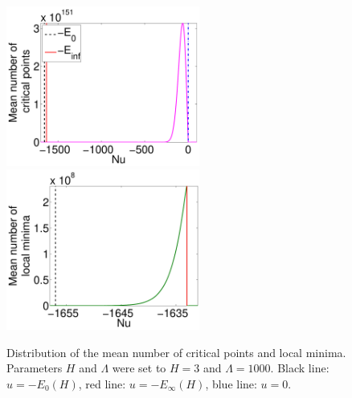 \documentclass[twoside]{article}
\begin{document}
\begin{figure}[htp!]
  \center
\includegraphics[width = 2.5in]{Distr_cp.pdf} 
\includegraphics[width = 2.5in]{Distr_lm.pdf}
\caption{Distribution of the mean number of critical points and local minima. Parameters $H$ and $\Lambda$ were set to $H = 3$ and $\Lambda = 1000$. Black line: $u = -E_0(H)$, red line: $u = -E_{\infty}(H)$, blue line: $u = 0$.}
\label{fig:Distr_cp_lm}
\end{figure}
\end{document}
